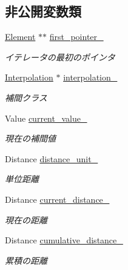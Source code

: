 \subsection*{非公開変数類}
\begin{DoxyCompactItemize}
\item 
\mbox{\hyperlink{class_interpolation_a01e71544809483d7a2ee72fe0007bcb0}{Element}} $\ast$$\ast$ \mbox{\hyperlink{class_interpolation_1_1_iterator___a7f82f4aca84c8510f9f6eb7467ba1963}{first\+\_\+pointer\+\_\+}}
\begin{DoxyCompactList}\small\item\em イテレータの最初のポインタ \end{DoxyCompactList}\item 
\mbox{\hyperlink{class_interpolation}{Interpolation}} $\ast$ \mbox{\hyperlink{class_interpolation_1_1_iterator___a0205ea80def2848af9e388e12a4bbaf8}{interpolation\+\_\+}}
\begin{DoxyCompactList}\small\item\em 補間クラス \end{DoxyCompactList}\item 
Value \mbox{\hyperlink{class_interpolation_1_1_iterator___a436aa805d692156f4cbce6000077e241}{current\+\_\+value\+\_\+}}
\begin{DoxyCompactList}\small\item\em 現在の補間値 \end{DoxyCompactList}\item 
Distance \mbox{\hyperlink{class_interpolation_1_1_iterator___a7bbbda549ad4929ca4230f9e492a8377}{distance\+\_\+unit\+\_\+}}
\begin{DoxyCompactList}\small\item\em 単位距離 \end{DoxyCompactList}\item 
Distance \mbox{\hyperlink{class_interpolation_1_1_iterator___aa15b1800d74b447f44844b69584f3bcc}{current\+\_\+distance\+\_\+}}
\begin{DoxyCompactList}\small\item\em 現在の距離 \end{DoxyCompactList}\item 
Distance \mbox{\hyperlink{class_interpolation_1_1_iterator___a3f81fac380c54424671b6bd123e3fd9f}{cumulative\+\_\+distance\+\_\+}}
\begin{DoxyCompactList}\small\item\em 累積の距離 \end{DoxyCompactList}\item 
$$
\end{DoxyCompactItemize}
